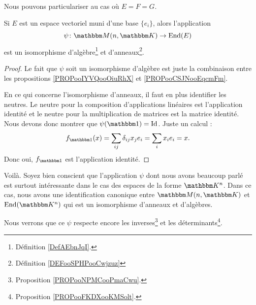 Nous pouvons particulariser au cas où \( E=F=G\).
\begin{proposition}     \label{PROPooFMBFooEVCLKA}
    Si \( E\) est un espace vectoriel muni d'une base \( \{ e_i \}\), alors l'application
    \begin{equation}
        \psi\colon \eM(n,\eK)\to \End(E)
    \end{equation}
    est un isomorphisme d'algèbre\footnote{Définition \ref{DefAEbnJqI}.} et d'anneaux\footnote{Définition \ref{DEFooSPHPooCwjzuz}}.
\end{proposition}

\begin{proof}
    Le fait que \( \psi\) soit un isomorphisme d'algèbre est juste la combinaison entre les propositions \ref{PROPooIYVQooOiuRhX} et \ref{PROPooCSJNooEqcmFm}.

    En ce qui concerne l'isomorphisme d'anneaux, il faut en plus identifier les neutres. Le neutre pour la composition d'applications linéaires est l'application identité et le neutre pour la multiplication de matrices est la matrice identité. Nous devons donc montrer que \( \psi(\mtu)=\id\). Juste un calcul :
    \begin{equation}
        f_{\mtu}(x)=\sum_{ij}\delta_{ij}x_je_i=\sum_ix_ie_i=x.
    \end{equation}
    Donc oui, \( f_{\mtu}\) est l'application identité.
\end{proof}

Voilà. Soyez bien conscient que l'application \( \psi\) dont nous avons beaucoup parlé est surtout intéressante dans le cas des espaces de la forme \( \eK^n\). Dans ce cas, nous avons une identification canonique entre \( \eM(n,\eK)\) et \( \End(\eK^n)\) qui est un isomorphisme d'anneaux et d'algèbres.

Nous verrons que ce \( \psi\) respecte encore les inverses\footnote{Proposition \ref{PROPooNPMCooPmaCwu}.} et les déterminants\footnote{Proposition \ref{PROPooFKDXooKMSolt}.}.

